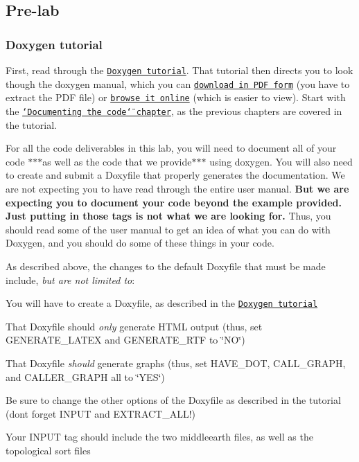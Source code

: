 \subsection*{Pre-\/lab }

\subsubsection*{Doxygen tutorial}

First, read through the \href{../../tutorials/11-doxygen/index.html}{\tt Doxygen tutorial}. That tutorial then directs you to look though the doxygen manual, which you can \href{http://www.stack.nl/~dimitri/doxygen/download.html#dlmanual}{\tt download in P\+DF form} (you have to extract the P\+DF file) or \href{http://www.stack.nl/~dimitri/doxygen/manual/index.html}{\tt browse it online} (which is easier to view). Start with the \href{http://www.stack.nl/~dimitri/doxygen/manual/docblocks.html}{\tt \char`\"{}\+Documenting the code\char`\"{} chapter}, as the previous chapters are covered in the tutorial.

For all the code deliverables in this lab, you will need to document all of your code $\ast$$\ast$$\ast$as well as the code that we provide$\ast$$\ast$$\ast$ using doxygen. You will also need to create and submit a Doxyfile that properly generates the documentation. We are not expecting you to have read through the entire user manual. {\bfseries But we are expecting you to document your code beyond the example provided. Just putting in those tags is not what we are looking for.} Thus, you should read some of the user manual to get an idea of what you can do with Doxygen, and you should do some of these things in your code.

As described above, the changes to the default Doxyfile that must be made include, {\itshape but are not limited to}\+:


\begin{DoxyItemize}
\item You will have to create a Doxyfile, as described in the \href{../../tutorials/11-doxygen/index.html}{\tt Doxygen tutorial}
\item That Doxyfile should {\itshape only} generate H\+T\+ML output (thus, set {\ttfamily G\+E\+N\+E\+R\+A\+T\+E\+\_\+\+L\+A\+T\+EX} and {\ttfamily G\+E\+N\+E\+R\+A\+T\+E\+\_\+\+R\+TF} to \char`\"{}\+N\+O\char`\"{})
\item That Doxyfile {\itshape should} generate graphs (thus, set {\ttfamily H\+A\+V\+E\+\_\+\+D\+OT}, {\ttfamily C\+A\+L\+L\+\_\+\+G\+R\+A\+PH}, and {\ttfamily C\+A\+L\+L\+E\+R\+\_\+\+G\+R\+A\+PH} all to \char`\"{}\+Y\+E\+S\char`\"{})
\item Be sure to change the other options of the Doxyfile as described in the tutorial (don\textquotesingle{}t forget {\ttfamily I\+N\+P\+UT} and {\ttfamily E\+X\+T\+R\+A\+C\+T\+\_\+\+A\+LL}!)
\item Your {\ttfamily I\+N\+P\+UT} tag should include the two middleearth files, as well as the topological sort files
\end{DoxyItemize}

